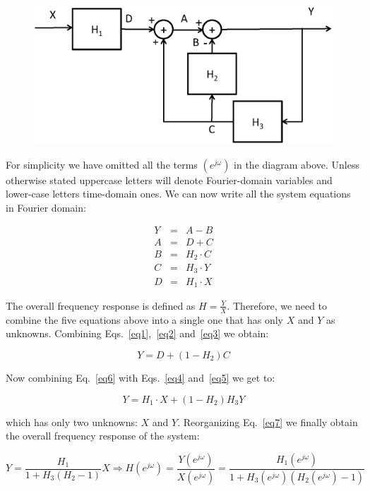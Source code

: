 \documentclass[a4paper,11pt,oneside]{article}
\begin{document}
\begin{figure}[h!]
\centering
\includegraphics[width=.7\textwidth]{fig2.eps}
\end{figure}

For simplicity we have omitted all the terms $(e^{j\omega})$ in the diagram above. Unless otherwise stated uppercase letters will denote Fourier-domain variables and lower-case letters time-domain ones. We can now write all the system equations in Fourier domain:

\begin{eqnarray}
Y &=& A-B\label{eq1}\\
A &=& D+C\label{eq2}\\
B &=& H_2\cdot C\label{eq3}\\
C&=&H_3\cdot Y\label{eq4}\\
D&=&H_1 \cdot X\label{eq5}
\end{eqnarray}

The overall frequency response is defined as $H=\frac{Y}{X}$. Therefore, we need to combine the five equations above into a single one that has only $X$ and $Y$ as unknowns. Combining Eqs.~\ref{eq1},~\ref{eq2} and~\ref{eq3} we obtain:

\begin{equation}\label{eq6}
Y = D + (1-H_2)C
\end{equation}

Now combining Eq.~\ref{eq6} with Eqs.~\ref{eq4} and~\ref{eq5} we get to:

\begin{equation}\label{eq7}
Y = H_1\cdot X + (1-H_2)H_3 Y
\end{equation}

which has only two unknowns: $X$ and $Y$. Reorganizing Eq.~\ref{eq7} we finally obtain the overall frequency response of the system:

\begin{equation}
Y = \frac{H_1}{1+H_3(H_2-1)}X \Rightarrow H(e^{j\omega})=\frac{Y(e^{j\omega})}{X(e^{j\omega})}=\frac{H_1(e^{j\omega})}{1+H_3(e^{j\omega})(H_2(e^{j\omega})-1)}
\end{equation}
\end{document}

